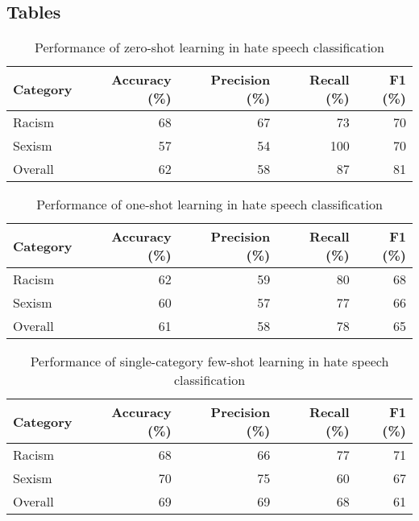 \documentclass{bmcart}
\begin{document}
\begin{backmatter}
\section*{Tables}

\begin{table}

\caption{\label{tab:zeroshot-summary}Performance of zero-shot learning in hate speech classification}
\centering
\begin{tabular}[t]{lrrrr}
\hline
Category & Accuracy (\%) & Precision (\%) & Recall (\%) & F1 (\%)\\
\hline
Racism & 68 & 67 & 73 & 70\\
Sexism & 57 & 54 & 100 & 70\\
Overall & 62 & 58 & 87 & 81\\
\hline
\end{tabular}
\end{table}



\begin{table}

\caption{\label{tab:oneshot-summary}Performance of one-shot learning in hate speech classification}
\centering
\begin{tabular}[t]{lrrrr}
\hline
Category & Accuracy (\%) & Precision (\%) & Recall (\%) & F1 (\%)\\
\hline
Racism & 62 & 59 & 80 & 68\\
Sexism & 60 & 57 & 77 & 66\\
Overall & 61 & 58 & 78 & 65\\
\hline
\end{tabular}
\end{table}



\begin{table}

\caption{\label{tab:fewshotsingle-summary}Performance of single-category few-shot learning in hate speech classification}
\centering
\begin{tabular}[t]{lrrrr}
\hline
Category & Accuracy (\%) & Precision (\%) & Recall (\%) & F1 (\%)\\
\hline
Racism & 68 & 66 & 77 & 71\\
Sexism & 70 & 75 & 60 & 67\\
Overall & 69 & 69 & 68 & 61\\
\hline
\end{tabular}
\end{table}




\end{backmatter}
\end{document}
